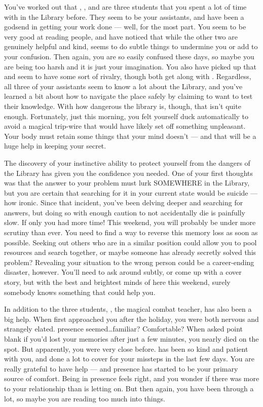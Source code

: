\documentclass[char]{GL2020}
\begin{document}
You've worked out that \cPresident{\intro}, \cLibAssist{\intro}, and \cAmbition{\intro} are three students that you spent a lot of time with in the Library before. They seem to be your assistants, and have been a godsend in getting your work done — well, for the most part. You seem to be very good at reading people, and have noticed that while the other two are genuinely helpful and kind, \cLibAssist{} seems to do subtle things to undermine you or add to your confusion. Then again, you are so easily confused these days, so maybe you are being too harsh and it is just your imagination. You also have picked up that \cLibAssist{} and \cAmbition{} seem to have some sort of rivalry, though both get along with \cPresident{}. Regardless, all three of your assistants seem to know a lot about the Library, and you've learned a bit about how to navigate the place safely by claiming to want to test their knowledge. With how dangerous the library is, though, that isn't quite enough. Fortunately, just this morning, you felt yourself duck automatically to avoid a magical trip-wire that would have likely set off something unpleasant. Your body must retain some things that your mind doesn't — and that will be a huge help in keeping your secret.

The discovery of your instinctive ability to protect yourself from the dangers of the Library has given you the confidence you needed. One of your first thoughts was that the answer to your problem must lurk SOMEWHERE in the Library, but you are certain that searching for it in your current state would be suicide — how ironic. Since that incident, you've been delving deeper and searching for answers, but doing so with enough caution to not accidentally die is painfully slow. If only you had more time! This weekend, you will probably be under more scrutiny than ever. You need to find a way to reverse this memory loss as soon as possible. Seeking out others who are in a similar position could allow you to pool resources and search together, or maybe someone has already secretly solved this problem? Revealing your situation to the wrong person could be a career-ending disaster, however. You'll need to ask around subtly, or come up with a cover story, but with the best and brightest minds of \pEarth{} here this weekend, surely somebody knows something that could help you.

In addition to the three students, \cInterpol{\intro}, the magical combat teacher, has also been a big help. When \cInterpol{\they} first approached you after the holiday, you were both nervous and strangely elated. \cInterpol{\Their} presence seemed…familiar? Comfortable? When \cInterpol{\they} asked point blank if you'd lost your memories after just a few minutes, you nearly died on the spot. But apparently, you were very close before. \cInterpol{} has been so kind and patient with you, and done a lot to cover for your missteps in the last few days. You are really grateful to have \cInterpol{\their} help — and \cInterpol{\their} presence has started to be your primary source of comfort. Being in \cInterpol{\their} presence feels right, and you wonder if there was more to your relationship than \cInterpol{} is letting on. But then again, you have been through a lot, so maybe you are reading too much into things. 
\end{document}
